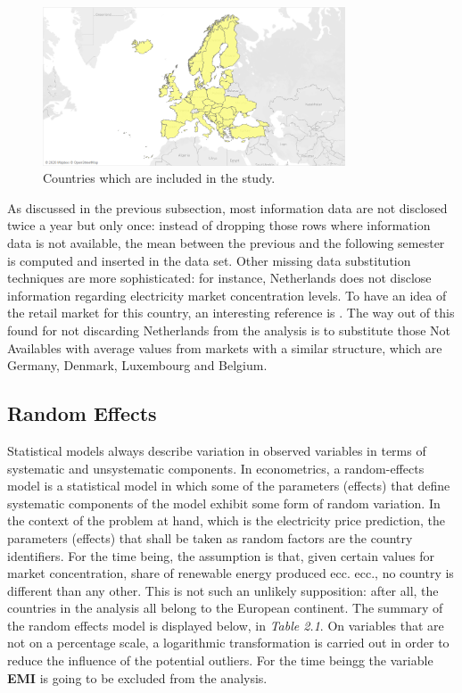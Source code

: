 \documentclass{book}
\begin{document}
\bigskip
\begin{figure}[H]
\begin{center}
\captionsetup{justification=centering}
\includegraphics[width=0.8\textwidth]{Images/cantries.png}
\caption{Countries which are included in the study.}
\end{center}
\end{figure}
\bigskip

As discussed in the previous subsection, most information data are not disclosed twice a year but only once: instead of dropping those rows where information data is not available, the mean between the previous and the following semester is computed and inserted in the data set. Other missing data substitution techniques are more sophisticated: for instance, Netherlands does not disclose information regarding electricity market concentration levels. To have an idea of the retail market for this country, an interesting reference is \cite{mulder2019dutch}.  The way out of this found for not discarding Netherlands from the analysis is to substitute those Not Availables with average values from markets with a similar structure, which are Germany, Denmark, Luxembourg and Belgium.

\subsection{Random Effects}

Statistical models always describe variation in observed variables in terms of systematic and unsystematic components. In econometrics, a random-effects model is a statistical model in which some of the parameters (effects) that define systematic components of the model exhibit some form of random variation.\cite{salkind2010encyclopedia} In the context of the problem at hand, which is the electricity price prediction, the parameters (effects) that shall be taken as random factors are the country identifiers. For the time being, the assumption is that, given certain values for market concentration, share of renewable energy produced ecc. ecc., no country is different than any other. This is not such an unlikely supposition: after all, the countries in the analysis all belong to the European continent. The summary of the random effects model is displayed below, in \textit{Table 2.1}. On variables that are not on a percentage scale, a logarithmic transformation is carried out in order to reduce the influence of the potential outliers. For the time beingg the variable \textbf{EMI} is going to be excluded from the analysis.
\end{document}
